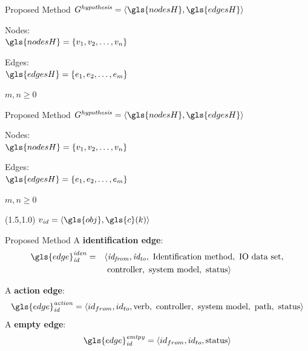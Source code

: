 \begin{frame}[fragile]{Proposed Method} 
$G^\mathit{hypothesis} = \left\langle \gls{nodesH}, \gls{edgesH} \right\rangle $
\vspace{0.5cm}\pause

Nodes:\\
$\gls{nodesH} = \{v_1,v_2, \dots, v_n\}$
\vspace{0.5cm}\pause

Edges:\\
$\gls{edgesH} = \{e_1,e_2, \dots, e_m\}$\bs

$m,n \geq 0$
\end{frame}

\begin{frame}[fragile]{Proposed Method} 
$G^\mathit{hypothesis} = \left\langle \gls{nodesH}, \gls{edgesH} \right\rangle $
\vspace{0.5cm}

Nodes:\\
$\gls{nodesH} = \{v_1,v_2, \dots, v_n\}$
\vspace{0.5cm}

Edges:\\
$\gls{edgesH} = \{e_1,e_2, \dots, e_m\}$\bs

$m,n \geq 0$
\begin{textblock}{3}(1.5,1.0)
$v_\mathit{id} =\left\langle \gls{obj}, \gls{c}(k)\right\rangle $
\end{textblock}
\end{frame}

\begin{frame}[fragile]{Proposed Method} 
A \textbf{identification edge}:
\begin{equation*}
\begin{split}
\gls{edge}^\mathit{iden}_\mathit{id}  = & \quad \langle \mathit{id_{from}}, \mathit{id_{to}}, \textrm{ Identification method}, \textrm{ IO data set}, \\
 & \quad \textrm{ controller}, \textrm{ system model}, \textrm{ status} \rangle
\end{split}
\end{equation*}

A \textbf{action edge}: \[\gls{edge}^\mathit{action}_\mathit{id} = \left\langle id_{from}, id_{to}, \textrm{verb}, \textrm{ controller},\textrm{ system model}, \textrm{ path}, \textrm{ status} \right\rangle\]\bs
A \textbf{empty edge}: \[\gls{edge}^\mathit{emtpy}_\mathit{id} = \left\langle id_{from}, id_{to}, \textrm{status} \right\rangle\]\bs
\end{frame}

